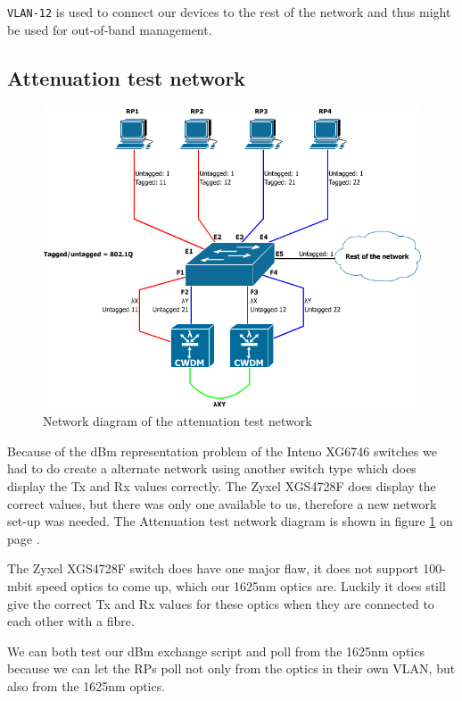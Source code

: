 \documentclass{article}
\begin{document}
\texttt{VLAN-12} is used to connect our devices to the rest of the network and thus might be used for out-of-band management.


\subsection{Attenuation test network}

\begin{figure}[h]
\centerline{\includegraphics[scale=0.4, trim = 0mm 0mm 0mm 0mm]{images/CWDM.png}}
\caption{Network diagram of the attenuation test network}
\label{fig:CWDM}
\end{figure}

Because of the dBm representation problem of the Inteno XG6746 switches we had to do create a alternate network using another switch type which does display the Tx and Rx values correctly. The Zyxel XGS4728F does display the correct values, but there was only one available to us, therefore a new network set-up was needed. The Attenuation test network diagram is shown in figure \ref{fig:CWDM} on page \pageref{fig:CWDM}.

The Zyxel XGS4728F switch does have one major flaw, it does not support 100-mbit speed optics to come up, which our 1625nm optics are. Luckily it does still give the correct Tx and Rx values for these optics when they are connected to each other with a fibre.

We can both test our dBm exchange script and poll from the 1625nm optics because we can let the RPs poll not only from the optics in their own VLAN, but also from the 1625nm optics.
\end{document}

